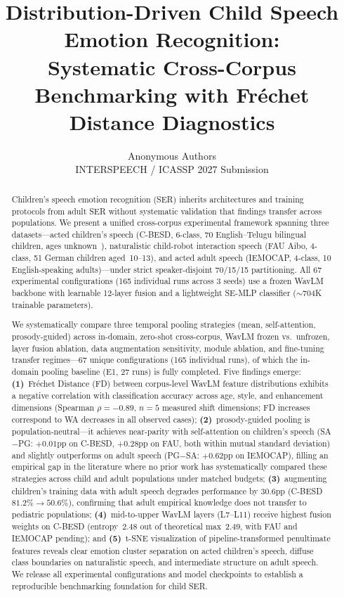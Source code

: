 \documentclass[11pt,a4paper]{article}
\title{Distribution-Driven Child Speech Emotion Recognition:\\
Systematic Cross-Corpus Benchmarking with Fr\'{e}chet Distance Diagnostics}
\author{Anonymous Authors\\
\small INTERSPEECH / ICASSP 2027 Submission}
\date{}
\begin{document}
\maketitle


\begin{abstract}
Children's speech emotion recognition (SER) inherits architectures and training
protocols from adult SER without systematic validation that findings transfer
across populations. We present a unified cross-corpus experimental framework
spanning three datasets---acted children's speech (C-BESD, 6-class, 70 English--Telugu bilingual
children, ages unknown~\cite{rao2024cbesd}), naturalistic child-robot interaction speech
(FAU Aibo, 4-class, 51 German children aged~10--13), and acted adult speech
(IEMOCAP, 4-class, 10 English-speaking
adults)---under strict speaker-disjoint 70/15/15 partitioning. All 67
experimental configurations (165 individual runs across 3 seeds) use a frozen
WavLM backbone with learnable 12-layer fusion and a lightweight SE-MLP
classifier ($\sim$704K trainable parameters).

We systematically compare three temporal pooling strategies (mean,
self-attention, prosody-guided) across in-domain, zero-shot cross-corpus,
WavLM frozen vs.\ unfrozen, layer fusion ablation, data augmentation
sensitivity, module ablation, and fine-tuning transfer regimes---67 unique
configurations (165 individual runs), of which the in-domain pooling baseline
(E1, 27 runs) is fully completed. Five findings emerge:
\textbf{(1)}~Fr\'{e}chet Distance (FD) between corpus-level WavLM feature
distributions exhibits a negative correlation with classification accuracy
across age, style, and enhancement dimensions (Spearman $\rho = -0.89$,
$n=5$ measured shift dimensions; FD increases correspond to WA decreases
in all observed cases);
\textbf{(2)}~prosody-guided pooling is population-neutral---it achieves
near-parity with self-attention on children's speech (SA$-$PG: $+0.01$pp on
C-BESD, $+0.28$pp on FAU, both within mutual standard deviation) and slightly
outperforms on adult speech (PG$-$SA: $+0.62$pp on IEMOCAP), filling an
empirical gap in the literature where no prior work has systematically compared
these strategies across child and adult populations under matched budgets;
\textbf{(3)}~augmenting children's training data with adult speech degrades
performance by $30.6$pp (C-BESD $81.2\% \rightarrow 50.6\%$), confirming that
adult empirical knowledge does not transfer to pediatric populations;
\textbf{(4)}~mid-to-upper WavLM layers (L7--L11) receive highest fusion weights
on C-BESD (entropy~2.48 out of theoretical max~2.49, with FAU and IEMOCAP
pending); and
\textbf{(5)}~t-SNE visualization of pipeline-transformed penultimate features
reveals clear emotion cluster separation on acted children's speech, diffuse
class boundaries on naturalistic speech, and intermediate structure on adult
speech. We release all experimental configurations and
model checkpoints to establish a reproducible benchmarking foundation for child
SER.
\end{abstract}
\end{document}
